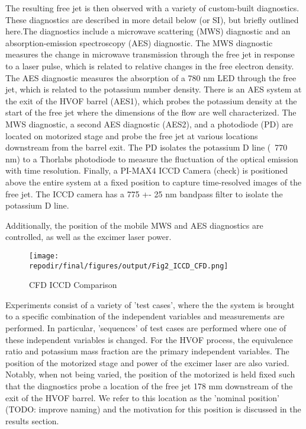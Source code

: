 The resulting free jet is then observed with a variety of custom-built diagnostics. These diagnostics are described in more detail below (or SI), but briefly outlined here.The diagnostics include a microwave scattering (MWS) diagnostic and an absorption-emission spectroscopy (AES) diagnostic. The MWS diagnostic measures the change in microwave transmission through the free jet in response to a laser pulse, which is related to relative changes in the free electron density. The AES diagnostic measures the absorption of a 780 nm LED through the free jet, which is related to the potassium number density. There is an AES system at the exit of the HVOF barrel (AES1), which probes the potassium density at the start of the free jet where the dimensions of the flow are well characterized. The MWS diagnostic, a second AES diagnostic (AES2), and a photodiode (PD) are located on motorized stage and probe the free jet at various locations downstream from the barrel exit. The PD isolates the potassium D line (~770 nm) to a Thorlabs photodiode to measure the fluctuation of the optical emission with time resolution. Finally, a PI-MAX4 ICCD Camera (check) is positioned above the entire system at a fixed position to capture time-resolved images of the free jet. The ICCD camera has a 775 +- 25 nm bandpass filter to isolate the potassium D line.

Additionally, the position of the mobile MWS and AES diagnostics are controlled, as well as the excimer laser power. 

\begin{figure}[h]
    \texttt{[image: \\repodir/final/figures/output/Fig2\_ICCD\_CFD.png]} 
    \caption{CFD ICCD Comparison}
    \label{fig:ICCD_CFD}
\end{figure}


Experiments consist of a variety of 'test cases', where the the system is brought to a specific combination of the independent variables and measurements are performed. In particular, 'sequences' of test cases are performed where one of these independent variables is changed. For the HVOF process, the equivalence ratio and potassium mass fraction are the primary independent variables. The position of the motorized stage and power of the excimer laser are also varied. Notably, when not being varied, the position of the motorized is held fixed such that the diagnostics probe a location of the free jet 178 mm downstream of the exit of the HVOF barrel. We refer to this location as the 'nominal position' (TODO: improve naming) and the motivation for this position is discussed in the results section.  

